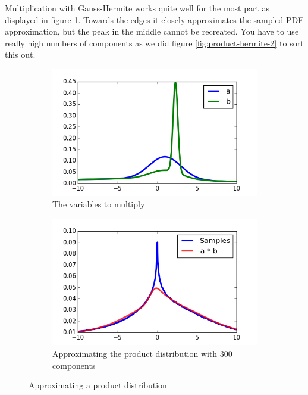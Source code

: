 \documentclass[11pt,a4paper]{book}
\begin{document}
Multiplication with Gauss-Hermite works quite well for the most part as
displayed in figure \ref{fig:product-hermite}. Towards the edges it closely
approximates the sampled PDF approximation, but the peak in the middle cannot be
recreated. You have to use really high numbers of components as we did figure
\ref{fig:product-hermite-2} to sort this out.
\begin{figure}[h]
  \centering
  \begin{subfigure}[t]{0.45\textwidth}
    \centering
    \includegraphics[width=\textwidth]{thesis/operations/product-hermite-vars}
    \caption{The variables to multiply}
  \end{subfigure}
  \hfill
  \begin{subfigure}[t]{0.45\textwidth}
    \centering
    \includegraphics[width=\textwidth]{thesis/operations/product-hermite-50-components}
    \caption{Approximating the product distribution with $300$ components}
  \end{subfigure}
  \caption{Approximating a product distribution}
  \label{fig:product-hermite}
\end{figure}
\end{document}
